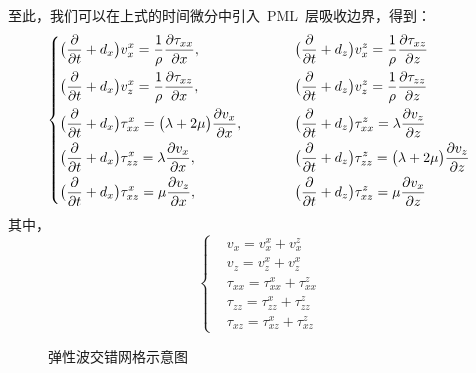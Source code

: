\documentclass[UTF8]{ctexart}
\begin{document}
至此，我们可以在上式的时间微分中引入~PML~层吸收边界，得到：
\begin{equation}
\left\{ \begin{aligned}
& \big(\frac{\partial}{\partial t}+d_x\big)v_x^x=\frac{1}{\rho}\frac{\partial \tau_{xx}}{\partial x}, & \hspace{10mm} & \big(\frac{\partial}{\partial t}+d_z\big)v_x^z=\frac{1}{\rho}\frac{\partial \tau_{xz}}{\partial z} \\
& \big(\frac{\partial}{\partial t}+d_x\big)v_z^x=\frac{1}{\rho}\frac{\partial \tau_{xz}}{\partial x}, & \hspace{10mm} & \big(\frac{\partial}{\partial t}+d_z\big)v_z^z=\frac{1}{\rho}\frac{\partial \tau_{zz}}{\partial z} \\
& \big(\frac{\partial}{\partial t}+d_x\big)\tau_{xx}^x=\big(\lambda+2\mu\big)\frac{\partial v_x}{\partial x}, & \hspace{10mm} & \big(\frac{\partial}{\partial t}+d_z\big)\tau_{xx}^z=\lambda\frac{\partial v_z}{\partial z} \\
& \big(\frac{\partial}{\partial t}+d_x\big)\tau_{zz}^x=\lambda\frac{\partial v_x}{\partial x}, & \hspace{10mm} & \big(\frac{\partial}{\partial t}+d_z\big)\tau_{zz}^z=\big(\lambda+2\mu\big)\frac{\partial v_z}{\partial z} \\
& \big(\frac{\partial}{\partial t}+d_x\big)\tau_{xz}^x=\mu\frac{\partial v_z}{\partial x}, & \hspace{10mm} & \big(\frac{\partial}{\partial t}+d_z\big)\tau_{xz}^z=\mu\frac{\partial v_x}{\partial z}
\end{aligned} \right.
\end{equation}
其中，
\begin{equation}\label{eq:vt+}
\left\{ \begin{aligned}
& v_x=v_x^x+v_x^z \\
& v_z=v_z^x+v_z^x \\
& \tau_{xx}=\tau_{xx}^x+\tau_{xx}^z \\
& \tau_{zz}=\tau_{zz}^x+\tau_{zz}^z \\
& \tau_{xz}=\tau_{xz}^x+\tau_{xz}^z
\end{aligned} \right.
\end{equation}

\begin{figure}[t]
  \centering
  
  \caption{弹性波交错网格示意图}\label{fig:esg}
\end{figure}
\end{document}
